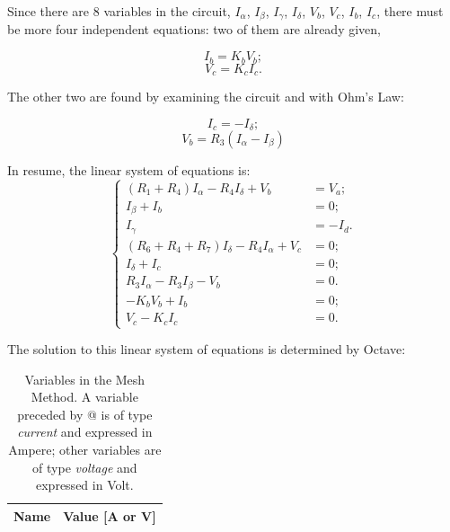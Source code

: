 Since there are 8 variables in the circuit, $I_{\alpha}$, $I_{\beta}$, $I_{\gamma}$, $I_{\delta}$, $V_b$, $V_c$, $I_b$, $I_c$, there must be more four independent equations: two of them are already given,

\begin{equation}
  I_b = K_bV_b;
  \label{eq:Vb_Ib}
\end{equation}
\begin{equation}
  V_c = K_cI_c.
  \label{eq:Vc_Ic}
\end{equation}

The other two are found by examining the circuit and with Ohm's Law:

\begin{equation}
  I_c = - I_{\delta};
  \label{eq:MM_Ic}
\end{equation}
\begin{equation}
  V_b = R_3(I_{\alpha}-I_{\beta})
  \label{eq:MM_Vb}
\end{equation}

In resume, the linear system of equations is:
\begin{equation}
\begin{cases}
	(R_1+R_4)I_{\alpha} - R_4I_{\delta} + V_b &= V_a;					\\
  	I_{\beta} + I_b &= 0;												\\
  	I_{\gamma} &= - I_d.												\\
  	(R_6+R_4+R_7)I_{\delta} - R_4I_{\alpha} + V_c &= 0;					\\
  	I_{\delta} + I_c &= 0; 												\\
  	R_3I_{\alpha} - R_3I_{\beta} - V_b &= 0.							\\
  	-K_bV_b + I_b &= 0;													\\
  	V_c - K_cI_c &= 0.
\end{cases}
\end{equation}

The solution to this linear system of equations is determined by Octave:
\begin{table}[h]
  \centering
  \begin{tabular}{|l|r|}
    \hline    
    {\bf Name} & {\bf Value [A or V]} \\ \hline
    
  \end{tabular}
  \caption{Variables in the Mesh Method. A variable preceded by @ is of type {\em current} and expressed in Ampere; other variables are of type {\em voltage} and expressed in Volt.}
  \label{tab:malhas}
\end{table}

